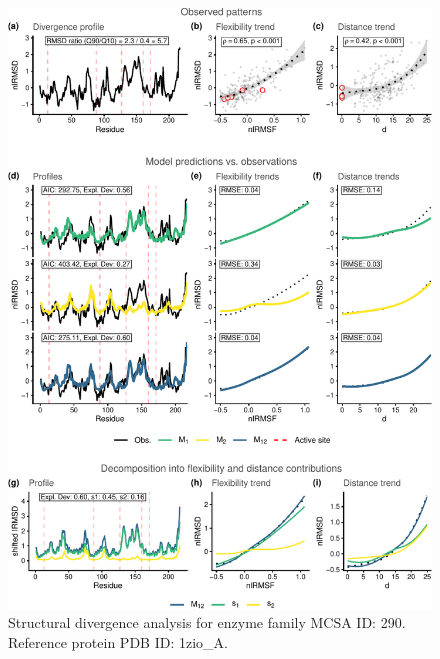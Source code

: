 \documentclass[
]{article}
\begin{document}
\clearpage
\begin{figure}[H]
\centering


\begin{center}\includegraphics{supplementary_material_files/figure-latex/generate_figures-15} \end{center}

\caption{Structural divergence analysis for enzyme family MCSA ID: 290. Reference protein PDB ID: 1zio\_A.}
\end{figure}
\end{document}
